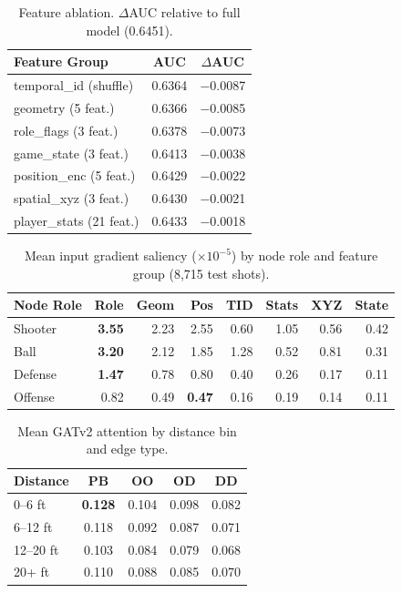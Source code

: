 \documentclass{article}
\begin{document}
\begin{table}[H]
\centering
\caption{Feature ablation. $\Delta$AUC relative to full model (0.6451).}
\label{tab:ablation}
\small
\begin{tabular}{@{}lcc@{}}
\toprule
\textbf{Feature Group} & \textbf{AUC} & \textbf{$\Delta$AUC} \\
\midrule
temporal\_id (shuffle) & 0.6364 & $-$0.0087 \\
geometry (5 feat.) & 0.6366 & $-$0.0085 \\
role\_flags (3 feat.) & 0.6378 & $-$0.0073 \\
game\_state (3 feat.) & 0.6413 & $-$0.0038 \\
position\_enc (5 feat.) & 0.6429 & $-$0.0022 \\
spatial\_xyz (3 feat.) & 0.6430 & $-$0.0021 \\
player\_stats (21 feat.) & 0.6433 & $-$0.0018 \\
\bottomrule
\end{tabular}
\end{table}

\begin{table}[H]
\centering
\caption{Mean input gradient saliency ($\times 10^{-5}$) by node role and feature group (8,715 test shots).}
\label{tab:saliency}
\small
\begin{tabular}{@{}lrrrrrrr@{}}
\toprule
\textbf{Node Role} & \textbf{Role} & \textbf{Geom} & \textbf{Pos} & \textbf{TID} & \textbf{Stats} & \textbf{XYZ} & \textbf{State} \\
\midrule
Shooter  & \textbf{3.55} & 2.23 & 2.55 & 0.60 & 1.05 & 0.56 & 0.42 \\
Ball     & \textbf{3.20} & 2.12 & 1.85 & 1.28 & 0.52 & 0.81 & 0.31 \\
Defense  & \textbf{1.47} & 0.78 & 0.80 & 0.40 & 0.26 & 0.17 & 0.11 \\
Offense  & 0.82 & 0.49 & \textbf{0.47} & 0.16 & 0.19 & 0.14 & 0.11 \\
\bottomrule
\end{tabular}
\end{table}

\begin{table}[H]
\centering
\caption{Mean GATv2 attention by distance bin and edge type.}
\label{tab:attn_distance}
\small
\begin{tabular}{@{}lcccc@{}}
\toprule
\textbf{Distance} & \textbf{PB} & \textbf{OO} & \textbf{OD} & \textbf{DD} \\
\midrule
0--6 ft   & \textbf{0.128} & 0.104 & 0.098 & 0.082 \\
6--12 ft  & 0.118 & 0.092 & 0.087 & 0.071 \\
12--20 ft & 0.103 & 0.084 & 0.079 & 0.068 \\
20+ ft    & 0.110 & 0.088 & 0.085 & 0.070 \\
\bottomrule
\end{tabular}
\end{table}
\end{document}
